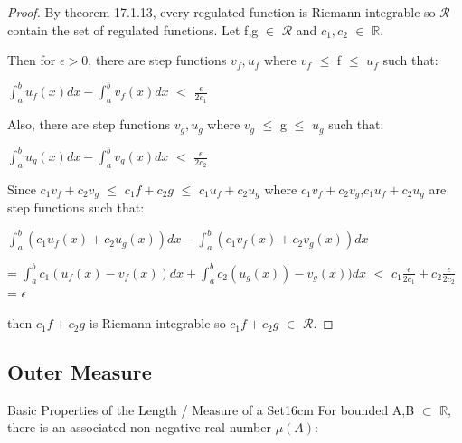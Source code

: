     \begin{proof}
        By {\color{red} theorem 17.1.13}, every regulated function
        is Riemann integrable so $\mathcal{R}$
        contain the set of regulated functions.
        Let f,g $\in$ $\mathcal{R}$ and $c_1,c_2$ $\in$ $\mathbb{R}$.
        
        Then for $\epsilon > 0$, there are step functions $v_f,u_f$ where
        $v_f$ $\leq$ f $\leq$ $u_f$ such that:

        \hspace{0.5cm}
        $\int_a^b u_f(x) dx - \int_a^b v_f(x) dx$ $<$ $\frac{\epsilon}{2c_1}$

        Also, there are step functions $v_g,u_g$ where
        $v_g$ $\leq$ g $\leq$ $u_g$ such that:

        \hspace{0.5cm}
        $\int_a^b u_g(x) dx - \int_a^b v_g(x) dx$ $<$ $\frac{\epsilon}{2c_2}$

        Since $c_1v_f + c_2v_g$
        $\leq$ $c_1f + c_2g$
        $\leq$ $c_1u_f + c_2u_g$
        where $c_1v_f + c_2v_g$,$c_1u_f + c_2u_g$ are step functions such that:

        \hspace{0.5cm}
        $\int_a^b (c_1u_f(x) + c_2u_g(x)) dx
            - \int_a^b (c_1v_f(x) + c_2v_g(x)) dx$

        \hspace{0.5cm}
        = $\int_a^b c_1(u_f(x) - v_f(x)) dx
            + \int_a^b c_2(u_g(x)) - v_g(x)) dx$
        $<$ $c_1\frac{\epsilon}{2c_1} + c_2\frac{\epsilon}{2c_2}$
        = $\epsilon$

        then $c_1f + c_2g$ is Riemann integrable so
        $c_1f + c_2g$ $\in$ $\mathcal{R}$.
    \end{proof}

    \vspace{0.5cm}





\subsection{ Outer Measure }

    \begin{definition}{Basic Properties of the Length / Measure of a Set}{16cm}
        For bounded A,B $\subset$ $\mathbb{R}$, there is an associated
        non-negative real number $\mu(A)$:
    \end{definition}


